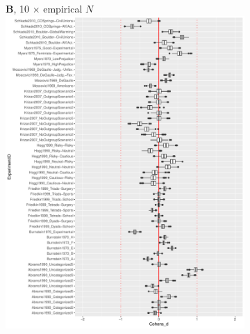 \documentclass[
  abstract]{article}
\begin{document}
\begin{figure}\ContinuedFloat
  \begin{subfigure}[]{0.9\textwidth}
    \centering
    \textsf{\large \textbf{B}, 10 $\times$ empirical $N$} \\
    \includegraphics[width=\textwidth]{Figures/boxplots/10N_metric_cohens.pdf}
    \label{fig:MetricBoxplot_10N}
  \end{subfigure}
\end{figure}
\end{document}
